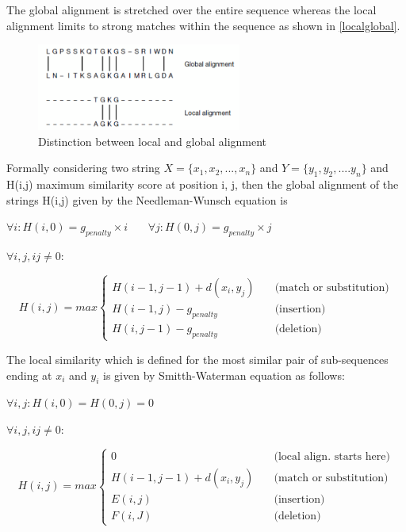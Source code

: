 \documentclass[12pt,twoside]{article}
\begin{document}
The global alignment is stretched over the entire sequence whereas the local alignment limits to strong matches within
the sequence as shown in \cref{localglobal}. 

\begin{figure}%
    \centering
    \includegraphics[width=0.6\textwidth]{fig/localglobal}
    \caption{Distinction between local and global alignment \cite[Figure 3.1]{mount_bioinformatics:_2004}}
    \label{fig:localglobal}
\end{figure}

Formally considering two string $ X = \{x_1, x_2, ..., x_n\} $ and $Y = \{y_1, y_2, .... y_n\}$
and H(i,j) maximum similarity score at position i, j, then the global alignment of the strings H(i,j) given by
the Needleman-Wunsch equation \cite{needleman_general_1970} is 

\( \forall i :  H(i,0) = g_{penalty} \times i \) \,\,\,\,\,\,\, \( \forall j :  H(0,j) = g_{penalty} \times j \)

\( \forall i,j,ij \neq 0: \)

\[ H(i,j) =  max
\begin{cases}	
	H(i - 1, j - 1) + d(x_i, y_j) & \quad \text{(match or substitution)} \\
	H(i - 1, j) - g_{penalty} 	  & \quad \text{(insertion)}\\
	H(i, j - 1) - g_{penalty}     & \quad \text{(deletion)}
\end{cases}
\]

The local similarity which is defined for the most similar pair of sub-sequences ending at $x_i$ and $y_i$ is given by
Smitth-Waterman \cite{smith_identification_1981} equation as follows:

\( \forall i,j :  H(i,0) = H(0,j) = 0 \)

\( \forall i,j,ij \neq 0: \)

\[ H(i,j) =  max
\begin{cases}
	0							  & \quad \text{(local align. starts here)} \\
	H(i - 1, j - 1) + d(x_i, y_j) & \quad \text{(match or substitution)} \\
	E(i,j)	  & \quad \text{(insertion)}\\
	F(i,J)    & \quad \text{(deletion)}
\end{cases}
\]
\end{document}
